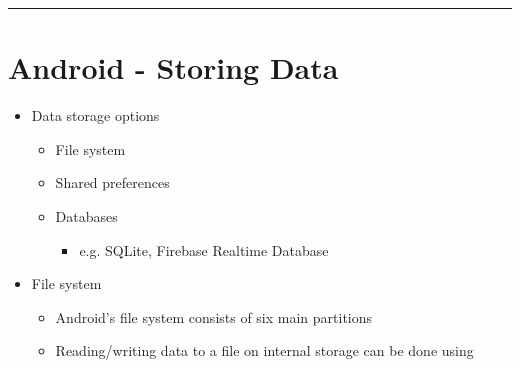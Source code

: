 \documentclass[11pt]{article}
\begin{document}
\noindent\rule{\textwidth}{2pt}
\section*{Android - Storing Data}
\begin{itemize}
	\item Data storage options
		\begin{itemize}
			\item File system
			\item Shared preferences
			\item Databases
				\begin{itemize}
					\item e.g. SQLite, Firebase Realtime Database
				\end{itemize}
		\end{itemize}

	\item File system
		\begin{itemize}
			\item Android’s file system consists of six main partitions
			\item Reading/writing data to a file on internal storage can be done using
		\end{itemize}


\end{itemize}
\end{document}
